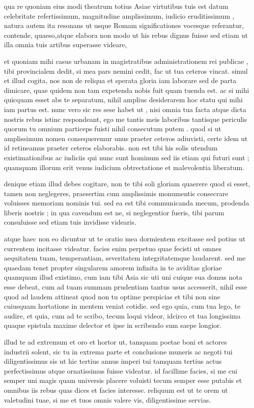  qua re quoniam eius modi theatrum totius Asiae virtutibus tuis est datum celebritate refertissimum, magnitudine amplissimum, iudicio eruditissimum , natura autem ita resonans ut usque Romam significationes vocesque referantur, contende, quaeso,atque elabora non modo ut his rebus dignus fuisse sed etiam ut illa omnia tuis artibus superasse videare,

 et quoniam mihi casus urbanam in magistratibus administrationem rei publicae , tibi provincialem dedit, si mea pars nemini cedit, fac ut tua ceteros vincat. simul et illud cogita, nos non de reliqua et sperata gloria iam laborare sed de parta dimicare, quae quidem non tam expetenda nobis fuit quam tuenda est. ac si mihi quicquam esset abs te separatum, nihil amplius desiderarem hoc statu qui mihi iam partus est. nunc vero sic res sese habet ut , nisi omnia tua facta atque dicta nostris rebus istinc respondeant, ego me tantis meis laboribus tantisque periculis quorum tu omnium particeps fuisti nihil consecutum putem . quod si ut amplissimum nomen consequeremur unus praeter ceteros adiuvisti, certe idem ut id retineamus praeter ceteros elaborabis. non est tibi his solis utendum existimationibus ac iudiciis qui nunc sunt hominum sed iis etiam qui futuri sunt ; quamquam illorum erit venus iudicium obtrectatione et malevolentia liberatum.

 denique etiam illud debes cogitare, non te tibi soli gloriam quaerere quod si esset, tamen non neglegeres, praesertim cum amplissimis monumentis consecrare voluisses memoriam nominis tui. sed ea est tibi communicanda mecum, prodenda liberis nostris ; in qua cavendum est ne, si neglegentior fueris, tibi parum consuluisse sed etiam tuis invidisse videaris.

 atque haec non eo dicuntur ut te oratio mea dormientem excitasse sed potius ut currentem incitasse videatur. facies enim perpetuo quae fecisti ut omnes aequitatem tuam, temperantiam, severitatem integritatemque laudarent. sed me quaedam tenet propter singularem amorem infinita in te aviditas gloriae quamquam illud existimo, cum iam tibi Asia sic uti uni cuique sua domus nota esse debeat, cum ad tuam summam prudentiam tantus usus accesserit, nihil esse quod ad laudem attineat quod non tu optime perspicias et tibi non sine cuiusquam hortatione in mentem veniat cotidie. sed ego quia, cum tua lego, te audire, et quia, cum ad te scribo, tecum loqui videor, idcirco et tua longissima quaque epistula maxime delector et ipse in scribendo sum saepe longior.

 illud te ad extremum et oro et hortor ut, tamquam poetae boni et actores industrii solent, sic tu in extrema parte et conclusione muneris ac negoti tui diligentissimus sis ut hic tertius annus imperi tui tamquam tertius actus perfectissimus atque ornatissimus fuisse videatur. id facillime facies, si me cui semper uni magis quam universis placere voluisti tecum semper esse putabis et omnibus iis rebus quas dices et facies interesse. reliquum est ut te orem ut valetudini tuae, si me et tuos omnis valere vis, diligentissime servias.
